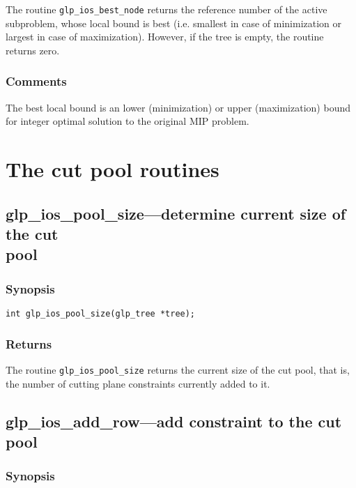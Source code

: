 The routine \verb|glp_ios_best_node| returns the reference number of
the active subproblem, whose local bound is best (i.e. smallest in case
of minimization or largest in case of maximization). However, if the
tree is empty, the routine returns zero.

\subsubsection*{Comments}

The best local bound is an lower (minimization) or upper (maximization)
bound for integer optimal solution to the original MIP problem.


\newpage

\section{The cut pool routines}

\subsection{glp\_ios\_pool\_size---determine current size of the cut\\
pool}

\subsubsection*{Synopsis}

\begin{verbatim}
int glp_ios_pool_size(glp_tree *tree);
\end{verbatim}

\subsubsection*{Returns}

The routine \verb|glp_ios_pool_size| returns the current size of the
cut pool, that is, the number of cutting plane constraints currently
added to it.

\subsection{glp\_ios\_add\_row---add constraint to the cut pool}

\subsubsection*{Synopsis}

